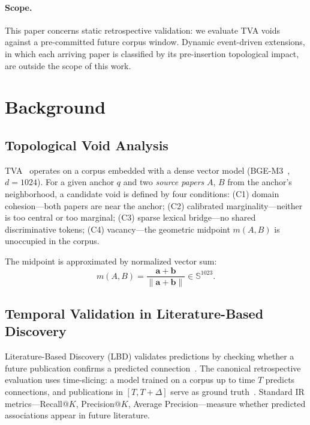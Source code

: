\documentclass[sigconf]{acmart}
\newcommand{\tva}{\textsf{TVA}}
\begin{document}
\paragraph{Scope.}
This paper concerns static retrospective validation: we evaluate \tva{} voids against a
pre-committed future corpus window.
Dynamic event-driven extensions, in which each arriving paper is classified by its
pre-insertion topological impact, are outside the scope of this work.

\section{Background}
\label{sec:background}

\subsection{Topological Void Analysis}

\tva{}~\cite{pan2026tva} operates on a corpus embedded with a dense vector model
(BGE-M3~\cite{bge-m3}, $d=1024$).
For a given anchor $q$ and two \emph{source papers} $A$, $B$ from the anchor's
neighborhood, a candidate void is defined by four conditions:
(C1) domain cohesion---both papers are near the anchor;
(C2) calibrated marginality---neither is too central or too marginal;
(C3) sparse lexical bridge---no shared discriminative tokens;
(C4) vacancy---the geometric midpoint $m(A,B)$ is unoccupied in the corpus.

The midpoint is approximated by normalized vector sum:
\begin{equation}
m(A,B) = \frac{\mathbf{a}+\mathbf{b}}{\|\mathbf{a}+\mathbf{b}\|} \in \mathbb{S}^{1023}.
\end{equation}

\subsection{Temporal Validation in Literature-Based Discovery}

Literature-Based Discovery (LBD) validates predictions by checking whether a future
publication confirms a predicted connection~\cite{swanson1986fish,gordon1996using}.
The canonical retrospective evaluation uses time-slicing: a model trained on a corpus
up to time $T$ predicts connections, and publications in $[T, T+\Delta]$ serve as
ground truth~\cite{weeber2001using}.
Standard IR metrics---Recall@$K$, Precision@$K$, Average Precision---measure whether
predicted associations appear in future literature.
\end{document}
